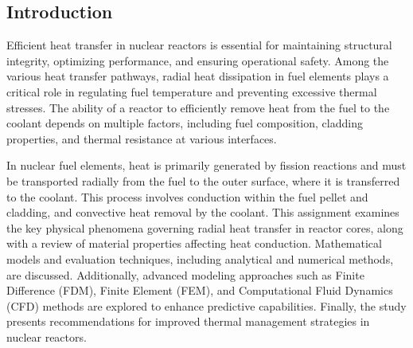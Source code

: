 \documentclass[12pt]{article}
\begin{document}
\begin{multicols}{2}

\section{Introduction}
Efficient heat transfer in nuclear reactors is essential for maintaining structural integrity, optimizing performance, and ensuring operational safety. Among the various heat transfer pathways, radial heat dissipation in fuel elements plays a critical role in regulating fuel temperature and preventing excessive thermal stresses. The ability of a reactor to efficiently remove heat from the fuel to the coolant depends on multiple factors, including fuel composition, cladding properties, and thermal resistance at various interfaces.

In nuclear fuel elements, heat is primarily generated by fission reactions and must be transported radially from the fuel to the outer surface, where it is transferred to the coolant. This process involves conduction within the fuel pellet and cladding, and convective heat removal by the coolant. This assignment examines the key physical phenomena governing radial heat transfer in reactor cores, along with a review of material properties affecting heat conduction. Mathematical models and evaluation techniques, including analytical and numerical methods, are discussed. Additionally, advanced modeling approaches such as Finite Difference (FDM), Finite Element (FEM), and Computational Fluid Dynamics (CFD) methods are explored to enhance predictive capabilities. Finally, the study presents recommendations for improved thermal management strategies in nuclear reactors.

\end{multicols}
\end{document}
